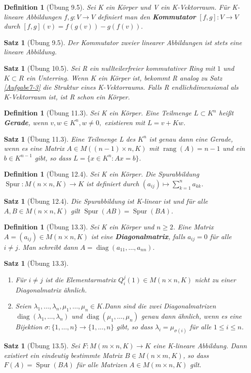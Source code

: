 \documentclass[12pt,a4paper]{article}
\theoremstyle{plain}
\newtheorem{Satz}[Theorem]{Satz}
\newtheorem{Definition}[Theorem]{Definition}
\newcommand{\herv}[1]{{\emph{\textbf{#1}}}}
\numberwithin{equation}{section}
\begin{document}
\begin{Definition}[Übung 9.5]
Sei K ein Körper und V ein K-Vektorraum. Für K-lineare Abbildungen $f,g: V \rightarrow V$ definiert man den \herv{Kommutator} $[f, g] : V \rightarrow V$ durch $[f, g](v) = f (g(v)) − g(f (v))$.
\end{Definition}
\begin{Satz}[Übung 9.5]
Der Kommutator zweier linearer Abbildungen ist stets eine lineare Abbildung.
\end{Satz}
\begin{Satz}[Übung 10.5]
Sei R ein nullteilerfreier kommutativer Ring mit $1$ und $K\subset R$ ein Unterring. Wenn K ein Körper ist, bekommt R analog zu Satz \ref{Aufgabe7-3} die Struktur eines K-Vektorraums. Falls R endlichdimensional als K-Vektorraum ist, ist R schon ein Körper.
\end{Satz}
\begin{Definition}[Übung 11.3]
Sei K ein Körper. Eine Teilmenge $L \subset K^n$ heißt \herv{Gerade}, wenn $v, w \in K^n , w \neq 0,$ existieren mit $L = v + Kw$.
\end{Definition}
\begin{Satz}[Übung 11.3]
Eine Teilmenge L des $K^n$ ist genau dann eine Gerade, wenn es eine Matrix $A\in M((n- 1) \times n, K)$ mit $\operatorname{rang}(A)= n-1$ und ein $b \in K^{n−1}$ gibt, so dass $L = \{x \in K^n : Ax = b\}$.
\end{Satz}
\begin{Definition}[Übung 12.4]
Sei K ein Körper. Die Spurabbildung $\operatorname{Spur}: M(n\times n, K) \rightarrow K$ ist definiert durch $(a_{ij}) \mapsto \sum_{k=1}^n{ a_{kk}}$.
\end{Definition}
\begin{Satz}[Übung 12.4]
Die Spurabbildung ist K-linear ist und für alle $A,B \in  M(n\times n,K)$ gilt $\operatorname{Spur}(AB) = \operatorname{Spur}(BA)$.
\end{Satz}
\begin{Definition}[Übung 13.3]
Sei K ein Körper und $n\geq 2$. Eine Matrix $A = (a_{ij}) \in M(n\times n, K)$ ist eine \herv{Diagonalmatrix}, falls $a_{ij} = 0$ für alle $i\neq j$. Man schreibt dann $A = \operatorname{diag}(a_{11},\ldots, a_{nn})$.
\end{Definition}
\begin{Satz}[Übung 13.3]
\begin{enumerate}
\renewcommand{\labelenumi}{\emph{(\alph{enumi})}}
\item Für $i\neq j$ ist die Elementarmatrix $Q^j_i(1) \in M(n\times n, K)$ nicht zu einer Diagonalmatrix ähnlich.
\item Seien $\lambda_1,\ldots, \lambda_n, \mu_1,\ldots,\mu_n \in K$.Dann sind die zwei Diagonalmatrizen $\operatorname{diag}(\lambda_1,\ldots,\lambda_n)$ und $\operatorname{diag}(\mu_1,\ldots,\mu_n)$ genau dann ähnlich, wenn es eine Bijektion $\sigma : \{1,\ldots, n\} \rightarrow \{1,\ldots, n\}$ gibt, so dass $\lambda_i = \mu_{\sigma(i)}$ für alle $1\leq i\leq n$.
\end{enumerate}
\end{Satz}
\begin{Satz}[Übung 13.5]
Sei $F: M (m \times n, K)\rightarrow K$ eine K-lineare Abbildung. Dann existiert ein eindeutig bestimmte Matrix $B \in M(n \times m, K)$, so dass $F(A) = \operatorname{Spur}(BA)$ für alle Matrizen $A \in M(m\times n, K)$ gilt.
\end{Satz}
\end{document}
